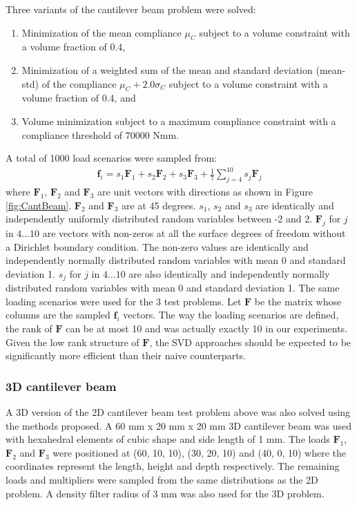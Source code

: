       Three variants of the cantilever beam problem were solved:
      \begin{enumerate}
        \item Minimization of the mean compliance $\mu_C$ subject to a volume constraint with a volume fraction of 0.4,
        \item Minimization of a weighted sum of the mean and standard deviation (mean-std) of the compliance $\mu_C + 2.0 \sigma_C$ subject to a volume constraint with a volume fraction of 0.4, and
        \item Volume minimization subject to a maximum compliance constraint with a compliance threshold of $70000 \text{ Nmm}$.
      \end{enumerate}
      A total of 1000 load scenarios were sampled from:
      \begin{align}
        \bm{f}_i = s_1 \bm{F}_1 + s_2 \bm{F}_2 + s_3 \bm{F}_3 + \frac{1}{7} \sum_{j=4}^{10} s_j \bm{F}_j
      \end{align}
      where $\bm{F}_1$, $\bm{F}_2$ and $\bm{F}_3$ are unit vectors with directions as shown in Figure \ref{fig:CantBeam}. $\bm{F}_2$ and $\bm{F}_3$ are at 45 degrees. $s_1$, $s_2$ and $s_3$ are identically and independently uniformly distributed random variables between -2 and 2. $\bm{F}_j$ for $j$ in $4 \dots 10$ are vectors with non-zeros at all the surface degrees of freedom without a Dirichlet boundary condition. The non-zero values are identically and independently normally distributed random variables with mean 0 and standard deviation 1. $s_j$ for $j$ in $4 \dots 10$ are also identically and independently normally distributed random variables with mean 0 and standard deviation 1. The same loading scenarios were used for the 3 test problems. Let $\bm{F}$ be the matrix whose columns are the sampled $\bm{f}_i$ vectors. The way the loading scenarios are defined, the rank of $\bm{F}$ can be at most 10 and was actually exactly 10 in our experiments. Given the low rank structure of $\bm{F}$, the SVD approaches should be expected to be significantly more efficient than their naive counterparts.

    \subsubsection{3D cantilever beam}

      A 3D version of the 2D cantilever beam test problem above was also solved using the methods proposed. A 60 mm x 20 mm x 20 mm 3D cantilever beam was used with hexahedral elements of cubic shape and side length of 1 mm. The loads $\bm{F}_1$, $\bm{F}_2$ and $\bm{F}_3$ were positioned at (60, 10, 10), (30, 20, 10) and (40, 0, 10) where the coordinates represent the length, height and depth respectively. The remaining loads and multipliers were sampled from the same distributions as the 2D problem. A density filter radius of 3 mm was also used for the 3D problem.

